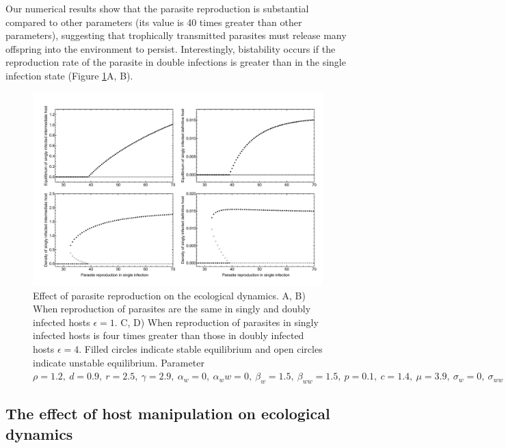 \documentclass[11pt]{article}
\begin{document}
Our numerical results show that the parasite reproduction is substantial compared to other parameters (its value is 40 times greater than other parameters), suggesting that trophically transmitted parasites must release many offspring into the environment to persist. 
Interestingly, bistability occurs if the reproduction rate of the parasite in double infections is greater than in the single infection state (Figure \ref{fig:bistability}A, B). 

\begin{figure}[!ht]
\includegraphics[width = \textwidth]{Figures/bistability.pdf}
\caption{Effect of parasite reproduction on the ecological dynamics. A, B) When reproduction of parasites are the same in singly and doubly infected hosts $\epsilon = 1$. C, D)  When reproduction of parasites in singly infected hosts is four times greater than those in doubly infected hosts $\epsilon = 4$. Filled circles indicate stable equilibrium and open circles indicate unstable equilibrium. Parameter $\rho = 1.2, \  d = 0.9, \  r = 2.5, \ \gamma = 2.9, \ \alpha_w = 0, \ \alpha_ww =  0, \ \beta_w = 1.5, \ \beta_{ww} = 1.5, \ p = 0.1, \  c = 1.4, \ \mu = 3.9,  \ \sigma_w = 0, \ \sigma_{ww} = 0, \  q = 0.01, \ \delta = 0.9, \ k = 0.26$
}
\label{fig:bistability}
\end{figure}

\subsection*{The effect of host manipulation on ecological dynamics}
\end{document}
